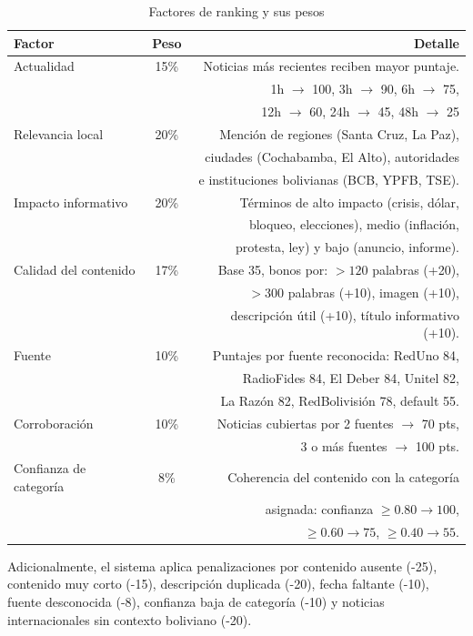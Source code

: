 \documentclass[12pt,oneside]{report}
\begin{document}
\begin{table}[H]
\centering
\begin{tabular}{lcr}
\toprule
\textbf{Factor} & \textbf{Peso} & \textbf{Detalle} \\
\midrule
Actualidad & 15\% & Noticias m\'as recientes reciben mayor puntaje. \\
& & 1h $\to$ 100, 3h $\to$ 90, 6h $\to$ 75, \\
& & 12h $\to$ 60, 24h $\to$ 45, 48h $\to$ 25 \\
\midrule
Relevancia local & 20\% & Menci\'on de regiones (Santa Cruz, La Paz), \\
& & ciudades (Cochabamba, El Alto), autoridades \\
& & e instituciones bolivianas (BCB, YPFB, TSE). \\
\midrule
Impacto informativo & 20\% & T\'erminos de alto impacto (crisis, d\'olar, \\
& & bloqueo, elecciones), medio (inflaci\'on, \\
& & protesta, ley) y bajo (anuncio, informe). \\
\midrule
Calidad del contenido & 17\% & Base 35, bonos por: $>120$ palabras (+20), \\
& & $>300$ palabras (+10), imagen (+10), \\
& & descripci\'on \'util (+10), t\'itulo informativo (+10). \\
\midrule
Fuente & 10\% & Puntajes por fuente reconocida: RedUno 84, \\
& & RadioFides 84, El Deber 84, Unitel 82, \\
& & La Raz\'on 82, RedBolivisi\'on 78, default 55. \\
\midrule
Corroboraci\'on & 10\% & Noticias cubiertas por 2 fuentes $\to$ 70 pts, \\
& & 3 o m\'as fuentes $\to$ 100 pts. \\
\midrule
Confianza de categor\'ia & 8\% & Coherencia del contenido con la categor\'ia \\
& & asignada: confianza $\ge 0.80 \to 100$, \\
& & $\ge 0.60 \to 75$, $\ge 0.40 \to 55$. \\
\bottomrule
\end{tabular}
\caption{Factores de ranking y sus pesos}
\end{table}

Adicionalmente, el sistema aplica penalizaciones por contenido ausente (-25), contenido muy corto (-15), descripci\'on duplicada (-20), fecha faltante (-10), fuente desconocida (-8), confianza baja de categor\'ia (-10) y noticias internacionales sin contexto boliviano (-20).
\end{document}
